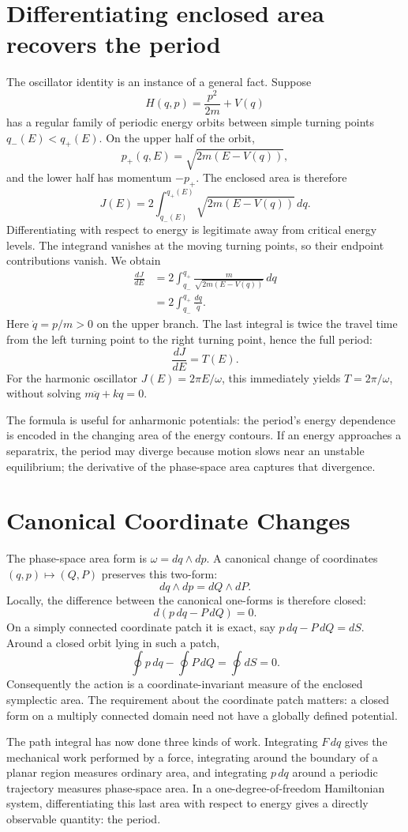 \section{Differentiating enclosed area recovers the period}

The oscillator identity is an instance of a general fact. Suppose
\[
 H(q,p)=\frac{p^2}{2m}+V(q)
\]
has a regular family of periodic energy orbits between simple turning points \(q_-(E)<q_+(E)\). On the upper half of the orbit,
\[
 p_+(q,E)=\sqrt{2m(E-V(q))},
\]
and the lower half has momentum \(-p_+\). The enclosed area is therefore
\[
 J(E)=2\int_{q_-(E)}^{q_+(E)}
            \sqrt{2m(E-V(q))}\,dq.
\]
Differentiating with respect to energy is legitimate away from critical energy levels. The integrand vanishes at the moving turning points, so their endpoint contributions vanish. We obtain
\[
\begin{aligned}
 \frac{dJ}{dE}
 &=2\int_{q_-}^{q_+}
       \frac{m}{\sqrt{2m(E-V(q))}}\,dq\\
 &=2\int_{q_-}^{q_+}\frac{dq}{\dot q}.
\end{aligned}
\]
Here \(\dot q=p/m>0\) on the upper branch. The last integral is twice the travel time from the left turning point to the right turning point, hence the full period:
\[
 \boxed{\frac{dJ}{dE}=T(E).}
\]
For the harmonic oscillator \(J(E)=2\pi E/\omega\), this immediately yields \(T=2\pi/\omega\), without solving \(m\ddot q+kq=0\).

The formula is useful for anharmonic potentials: the period's energy dependence is encoded in the changing area of the energy contours. If an energy approaches a separatrix, the period may diverge because motion slows near an unstable equilibrium; the derivative of the phase-space area captures that divergence.

\section{Canonical Coordinate Changes}

The phase-space area form is \(\omega=dq\wedge dp\). A canonical change of coordinates \((q,p)\mapsto(Q,P)\) preserves this two-form:
\[
 dq\wedge dp=dQ\wedge dP.
\]
Locally, the difference between the canonical one-forms is therefore closed:
\[
 d(p\,dq-P\,dQ)=0.
\]
On a simply connected coordinate patch it is exact, say \(p\,dq-P\,dQ=dS\). Around a closed orbit lying in such a patch,
\[
 \oint p\,dq-\oint P\,dQ=\oint dS=0.
\]
Consequently the action is a coordinate-invariant measure of the enclosed symplectic area. The requirement about the coordinate patch matters: a closed form on a multiply connected domain need not have a globally defined potential.

The path integral has now done three kinds of work. Integrating \(F\,dq\) gives the mechanical work performed by a force, integrating around the boundary of a planar region measures ordinary area, and integrating \(p\,dq\) around a periodic trajectory measures phase-space area. In a one-degree-of-freedom Hamiltonian system, differentiating this last area with respect to energy gives a directly observable quantity: the period.
